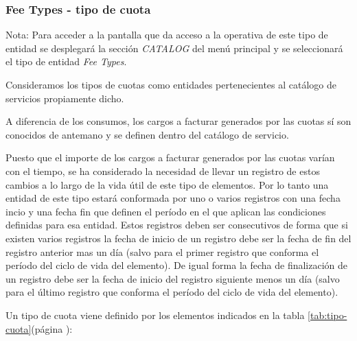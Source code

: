 \subsubsection{Fee Types - tipo de cuota}
\label{sub:fee-type}

Nota: Para acceder a la pantalla que da acceso a la operativa de este tipo de entidad se desplegará la sección \emph{CATALOG} del menú principal y se seleccionará el tipo de entidad \emph{Fee Types}.

Consideramos los tipos de cuotas como entidades pertenecientes al catálogo de servicios propiamente dicho.

A diferencia de los consumos, los cargos a facturar generados por las cuotas sí son conocidos de antemano y se definen dentro del catálogo de servicio.

Puesto que el importe de los cargos a facturar generados por las cuotas varían con el tiempo, se ha considerado la necesidad de llevar un registro de estos cambios a lo largo de la vida útil de este tipo de elementos. Por lo tanto una entidad de este tipo estará conformada por uno o varios registros con una fecha incio y una fecha fin que definen el período en el que aplican las condiciones definidas para esa entidad. Estos registros deben ser consecutivos de forma que si existen varios registros la fecha de inicio de un registro debe ser la fecha de fin del registro anterior mas un día (salvo para el primer registro que conforma el período del ciclo de vida del elemento). De igual forma la fecha de finalización de un registro debe ser la fecha de inicio del registro siguiente menos un día (salvo para el último registro que conforma el período del ciclo de vida del elemento).


Un tipo de cuota viene definido por los elementos indicados en la tabla \ref{tab:tipo-cuota}(página \pageref{tab:tipo-cuota}):




